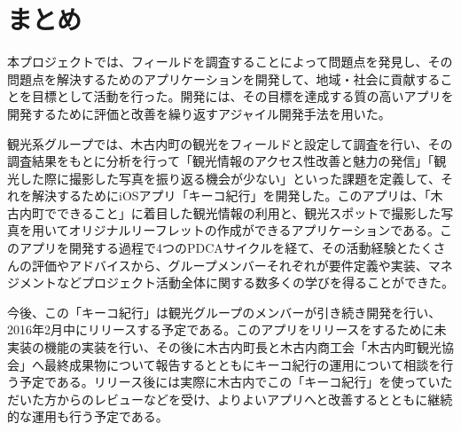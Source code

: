 \section{まとめ}
本プロジェクトでは、フィールドを調査することによって問題点を発見し、その問題点を解決するためのアプリケーションを開発して、地域・社会に貢献することを目標として活動を行った。開発には、その目標を達成する質の高いアプリを開発するために評価と改善を繰り返すアジャイル開発手法を用いた。\\
\par 観光系グループでは、木古内町の観光をフィールドと設定して調査を行い、その調査結果をもとに分析を行って「観光情報のアクセス性改善と魅力の発信」「観光した際に撮影した写真を振り返る機会が少ない」といった課題を定義して、それを解決するためにiOSアプリ「キーコ紀行」を開発した。このアプリは、「木古内町でできること」に着目した観光情報の利用と、観光スポットで撮影した写真を用いてオリジナルリーフレットの作成ができるアプリケーションである。このアプリを開発する過程で4つのPDCAサイクルを経て、その活動経験とたくさんの評価やアドバイスから、グループメンバーそれぞれが要件定義や実装、マネジメントなどプロジェクト活動全体に関する数多くの学びを得ることができた。\\
\par 今後、この「キーコ紀行」は観光グループのメンバーが引き続き開発を行い、2016年2月中にリリースする予定である。このアプリをリリースをするために未実装の機能の実装を行い、その後に木古内町長と木古内商工会「木古内町観光協会」へ最終成果物について報告するとともにキーコ紀行の運用について相談を行う予定である。リリース後には実際に木古内でこの「キーコ紀行」を使っていただいた方からのレビューなどを受け、よりよいアプリへと改善するとともに継続的な運用も行う予定である。
